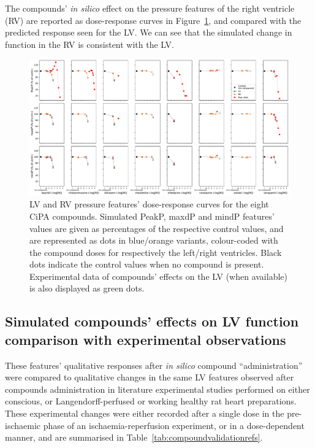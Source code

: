 \vspace{0.2cm}
The compounds' \textit{in silico} effect on the pressure features of the right ventricle (RV) are reported as dose-response curves in Figure~\ref{fig:LVRVfeatsalldrugsrespcurves}, and compared with the predicted response seen for the LV. We can see that the simulated change in function in the RV is consistent with the LV.

\begin{figure}[ht!]
    \myfloatalign
    \includegraphics[width=\textwidth]{figures/chapter06/simulated_cipa_compounds_effects_on_lv_rv_pressure_features_with_expdata.pdf}
    \caption{LV and RV pressure features' dose-response curves for the eight CiPA compounds. Simulated PeakP, maxdP and mindP features' values are given as percentages of the respective control values, and are represented as dots in blue/orange variants, colour-coded with the compound doses for respectively the left/right ventricles. Black dots indicate the control values when no compound is present. Experimental data of compounds' effects on the LV (when available) is also displayed as green dots.}
    \label{fig:LVRVfeatsalldrugsrespcurves}
\end{figure}


%
%
%
\subsection{Simulated compounds' effects on LV function comparison with experimental observations}\label{sec:ch6model_simulated_compounds'_effects_on_whole-organ_function_comparison_with_experimental_observations}
These features' qualitative responses after \textit{in silico} compound ``administration'' were compared to qualitative changes in the same LV features observed after compounds administration in literature experimental studies performed on either conscious, or Langendorff-perfused or working healthy rat heart preparations. These experimental changes were either recorded after a single dose in the pre-ischaemic phase of an ischaemia-reperfusion experiment, or in a dose-dependent manner, and are summarised in Table~\ref{tab:compoundvalidationrefs}.

